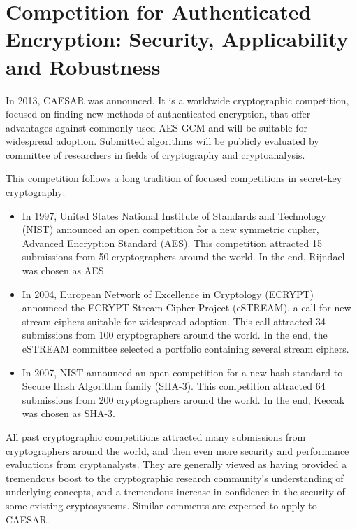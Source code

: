 \chapter{Competition for Authenticated Encryption: Security, Applicability and Robustness}

In 2013, CAESAR was announced. It is a worldwide cryptographic competition, focused on finding new methods of authenticated encryption, that offer advantages against commonly used AES-GCM and will be suitable for widespread adoption. Submitted algorithms will be publicly evaluated by committee of researchers in fields of cryptography and cryptoanalysis.

This competition follows a long tradition of focused competitions in secret-key cryptography:

\begin{itemize}
  \item In 1997, United States National Institute of Standards and Technology (NIST) announced an open competition for a new symmetric cupher, Advanced Encryption Standard (AES). This competition attracted 15 submissions from 50 cryptographers around the world. In the end, Rijndael was chosen as AES.
  \item In 2004, European Network of Excellence in Cryptology (ECRYPT) announced the ECRYPT Stream Cipher Project (eSTREAM), a call for new stream ciphers suitable for widespread adoption. This call attracted 34 submissions from 100 cryptographers around the world. In the end, the eSTREAM committee selected a portfolio containing several stream ciphers.
  \item In 2007, NIST announced an open competition for a new hash standard to Secure Hash Algorithm family (SHA-3). This competition attracted 64 submissions from 200 cryptographers around the world. In the end, Keccak was chosen as SHA-3.
\end{itemize}

All past cryptographic competitions attracted many submissions from cryptographers around the world, and then even more security and performance evaluations from cryptanalysts. They are generally viewed as having provided a tremendous boost to the cryptographic research community's understanding of underlying concepts, and a tremendous increase in confidence in the security of some existing cryptosystems. Similar comments are expected to apply to CAESAR. \cite{crypto-competitions}





